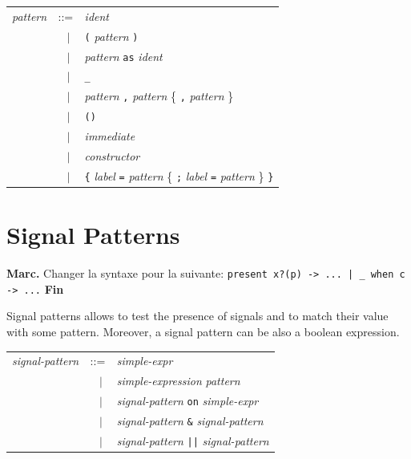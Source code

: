 \documentclass[11pt,titlepage,twoside]{report}
\newcommand{\alt}{\;|\;}
\newcommand{\Marc}[1]{{\bf Marc.} {#1} {\bf Fin}}
\newcommand{\term}[1]{{\tt #1}}
\newcommand{\nterm}[1]{{\em #1}}
\begin{document}
\begin{center}
\begin{tabular}{lcl}
\nterm{pattern} & ::=        & \nterm{ident} \\
                & $\;\;\alt$ & \term{(} \nterm{pattern} \term{)} \\
                & $\;\;\alt$ & \nterm{pattern} \term{as} \nterm{ident} \\
                & $\;\;\alt$ & \term{\_} \\
                & $\;\;\alt$ & \nterm{pattern} \term{,} \nterm{pattern} 
                               \{ \term{,} \nterm{pattern} \} \\
                & $\;\;\alt$ & \term{()} \\
                & $\;\;\alt$ & \nterm{immediate} \\
                & $\;\;\alt$ & \nterm{constructor} \\
                & $\;\;\alt$ & \term{\{} \nterm{label} 
                               \term{=} \nterm{pattern} \{ \term{;} 
                               \nterm{label} \term{=} \nterm{pattern}
                               \} \term{\}}
\end{tabular}
\end{center}

\section{Signal Patterns\label{sigpatterns}} %

\Marc{Changer la syntaxe pour la
  suivante: \texttt{present x?(p) -> ... | \_ when c -> ...}}

Signal patterns allows to test the presence of signals and to match
their value with some pattern. Moreover, a signal pattern can be also
a boolean expression.
\begin{center}
\begin{tabular}{lcl}
\nterm{signal-pattern} 
   & ::=        & \nterm{simple-expr} \\
   & $\;\;\alt$ & \nterm{simple-expression} \nterm{pattern} \\ 
   & $\;\;\alt$ & \nterm{signal-pattern} \term{on} \nterm{simple-expr} \\
   & $\;\;\alt$ & \nterm{signal-pattern} \term{\&} \nterm{signal-pattern} \\
   & $\;\;\alt$ & \nterm{signal-pattern} \term{||} \nterm{signal-pattern}
\end{tabular}
\end{center}
\end{document}
